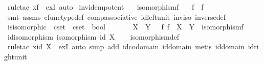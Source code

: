 \begin{isabellebody}
\ {\isacharparenleft}{\kern0pt}rule{\isacharunderscore}{\kern0pt}tac\ x{\isacharequal}{\kern0pt}f\ \ exI{\isacharcomma}{\kern0pt}\ auto{\isacharparenright}{\kern0pt}%
\endisatagproof
{\isafoldproof}%
%
\isadelimproof
\isanewline
%
\endisadelimproof
\isanewline
{}\isamarkupfalse%
\ inv{\isacharunderscore}{\kern0pt}idempotent{\isacharcolon}{\kern0pt}\isanewline
\ \ \ {\isachardoublequoteopen}isomorphism{\isacharparenleft}{\kern0pt}f{\isacharparenright}{\kern0pt}{\isachardoublequoteclose}\isanewline
\ \ \ {\isachardoublequoteopen}{\isacharparenleft}{\kern0pt}f\isactrlbold {\isasyminverse}{\isacharparenright}{\kern0pt}\isactrlbold {\isasyminverse}\ {\isacharequal}{\kern0pt}\ f{\isachardoublequoteclose}\isanewline
%
\isadelimproof
\ \ %
\endisadelimproof
%
\isatagproof
{}\isamarkupfalse%
\ {\isacharparenleft}{\kern0pt}smt\ assms\ cfunc{\isacharunderscore}{\kern0pt}type{\isacharunderscore}{\kern0pt}def\ comp{\isacharunderscore}{\kern0pt}associative\ id{\isacharunderscore}{\kern0pt}left{\isacharunderscore}{\kern0pt}unit\ inv{\isacharunderscore}{\kern0pt}iso\ inverse{\isacharunderscore}{\kern0pt}def{}{\isacharparenright}{\kern0pt}%
\endisatagproof
{\isafoldproof}%
%
\isadelimproof
\isanewline
%
\endisadelimproof
\ \ \isanewline
{}\isamarkupfalse%
\ is{\isacharunderscore}{\kern0pt}isomorphic\ {\isacharcolon}{\kern0pt}{\isacharcolon}{\kern0pt}\ {\isachardoublequoteopen}cset\ {\isasymRightarrow}\ cset\ {\isasymRightarrow}\ bool{\isachardoublequoteclose}\ {\isacharparenleft}{\kern0pt}\ {\isachardoublequoteopen}{\isasymcong}{\isachardoublequoteclose}\ {}{}{\isacharparenright}{\kern0pt}\ \ \isanewline
\ \ {\isachardoublequoteopen}X\ {\isasymcong}\ Y\ {\isasymlongleftrightarrow}\ {\isacharparenleft}{\kern0pt}{\isasymexists}\ f{\isachardot}{\kern0pt}\ f\ {\isacharcolon}{\kern0pt}\ X\ {\isasymrightarrow}\ Y\ {\isasymand}\ isomorphism{\isacharparenleft}{\kern0pt}f{\isacharparenright}{\kern0pt}{\isacharparenright}{\kern0pt}{\isachardoublequoteclose}\isanewline
\isanewline
{}\isamarkupfalse%
\ id{\isacharunderscore}{\kern0pt}isomorphism{\isacharcolon}{\kern0pt}\ {\isachardoublequoteopen}isomorphism\ {\isacharparenleft}{\kern0pt}id\ X{\isacharparenright}{\kern0pt}{\isachardoublequoteclose}\isanewline
%
\isadelimproof
\ \ %
\endisadelimproof
%
\isatagproof
{}\isamarkupfalse%
\ isomorphism{\isacharunderscore}{\kern0pt}def\isanewline
\ \ \isamarkupfalse%
\ {\isacharparenleft}{\kern0pt}rule{\isacharunderscore}{\kern0pt}tac\ x{\isacharequal}{\kern0pt}{\isachardoublequoteopen}id\ X{\isachardoublequoteclose}\ \ exI{\isacharcomma}{\kern0pt}\ auto\ simp\ add{\isacharcolon}{\kern0pt}\ id{\isacharunderscore}{\kern0pt}codomain\ id{\isacharunderscore}{\kern0pt}domain{\isacharcomma}{\kern0pt}\ metis\ id{\isacharunderscore}{\kern0pt}domain\ id{\isacharunderscore}{\kern0pt}right{\isacharunderscore}{\kern0pt}unit{\isacharparenright}{\kern0pt}%

\end{isabellebody}
